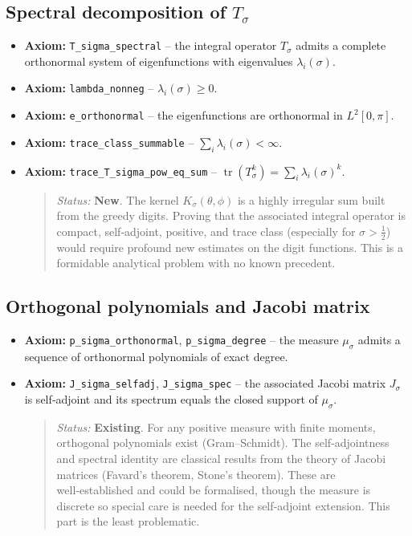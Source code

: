 \documentclass{article}
\begin{document}
\subsection{Spectral decomposition of $T_\sigma$}
\begin{itemize}
  \item \textbf{Axiom:} \texttt{T\_sigma\_spectral} – the integral operator $T_\sigma$ admits a complete orthonormal system of eigenfunctions with eigenvalues $\lambda_i(\sigma)$.
  \item \textbf{Axiom:} \texttt{lambda\_nonneg} – $\lambda_i(\sigma) \ge 0$.
  \item \textbf{Axiom:} \texttt{e\_orthonormal} – the eigenfunctions are orthonormal in $L^2[0,\pi]$.
  \item \textbf{Axiom:} \texttt{trace\_class\_summable} – $\sum_i \lambda_i(\sigma) < \infty$.
  \item \textbf{Axiom:} \texttt{trace\_T\_sigma\_pow\_eq\_sum} – $\operatorname{tr}(T_\sigma^k) = \sum_i \lambda_i(\sigma)^k$.
  \begin{quote}
    \emph{Status:} \textbf{New}.  The kernel $K_\sigma(\theta,\phi)$ is a highly irregular sum built from the greedy digits.  Proving that the associated integral operator is compact, self‑adjoint, positive, and trace class (especially for $\sigma > \frac12$) would require profound new estimates on the digit functions.  This is a formidable analytical problem with no known precedent.
  \end{quote}
\end{itemize}

\subsection{Orthogonal polynomials and Jacobi matrix}
\begin{itemize}
  \item \textbf{Axiom:} \texttt{p\_sigma\_orthonormal}, \texttt{p\_sigma\_degree} – the measure $\mu_\sigma$ admits a sequence of orthonormal polynomials of exact degree.
  \item \textbf{Axiom:} \texttt{J\_sigma\_selfadj}, \texttt{J\_sigma\_spec} – the associated Jacobi matrix $J_\sigma$ is self‑adjoint and its spectrum equals the closed support of $\mu_\sigma$.
  \begin{quote}
    \emph{Status:} \textbf{Existing}.  For any positive measure with finite moments, orthogonal polynomials exist (Gram–Schmidt).  The self‑adjointness and spectral identity are classical results from the theory of Jacobi matrices (Favard’s theorem, Stone’s theorem).  These are well‑established and could be formalised, though the measure is discrete so special care is needed for the self‑adjoint extension.  This part is the least problematic.
  \end{quote}
\end{itemize}
\end{document}
